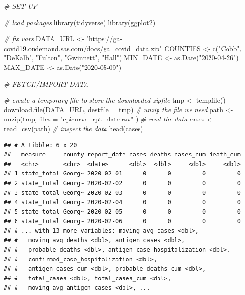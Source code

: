 \documentclass[
  12pt,
]{style/krantz}
\newenvironment{Shaded}{\begin{snugshade}}{\end{snugshade}}
\newcommand{\AttributeTok}[1]{\textcolor[rgb]{0.77,0.63,0.00}{#1}}
\newcommand{\CommentTok}[1]{\textcolor[rgb]{0.56,0.35,0.01}{\textit{#1}}}
\newcommand{\FunctionTok}[1]{\textcolor[rgb]{0.00,0.00,0.00}{#1}}
\newcommand{\NormalTok}[1]{#1}
\newcommand{\OtherTok}[1]{\textcolor[rgb]{0.56,0.35,0.01}{#1}}
\newcommand{\StringTok}[1]{\textcolor[rgb]{0.31,0.60,0.02}{#1}}
\begin{document}
\begin{Shaded}
\begin{Highlighting}[]
\CommentTok{\# SET UP {-}{-}{-}{-}{-}{-}{-}{-}{-}{-}{-}{-}{-}{-}{-}{-}}

\CommentTok{\# load packages}
\FunctionTok{library}\NormalTok{(tidyverse)}
\FunctionTok{library}\NormalTok{(ggplot2)}

\CommentTok{\# fix vars}
\NormalTok{DATA\_URL }\OtherTok{\textless{}{-}} \StringTok{"https://ga{-}covid19.ondemand.sas.com/docs/ga\_covid\_data.zip"}
\NormalTok{COUNTIES }\OtherTok{\textless{}{-}} \FunctionTok{c}\NormalTok{(}\StringTok{"Cobb"}\NormalTok{, }\StringTok{"DeKalb"}\NormalTok{, }\StringTok{"Fulton"}\NormalTok{, }\StringTok{"Gwinnett"}\NormalTok{, }\StringTok{"Hall"}\NormalTok{)}
\NormalTok{MIN\_DATE }\OtherTok{\textless{}{-}} \FunctionTok{as.Date}\NormalTok{(}\StringTok{"2020{-}04{-}26"}\NormalTok{)}
\NormalTok{MAX\_DATE }\OtherTok{\textless{}{-}} \FunctionTok{as.Date}\NormalTok{(}\StringTok{"2020{-}05{-}09"}\NormalTok{)}


\CommentTok{\# FETCH/IMPORT DATA {-}{-}{-}{-}{-}{-}{-}{-}{-}{-}{-}{-}{-}{-}{-}{-}{-}{-}{-}{-}{-}{-}{-}}

\CommentTok{\# create a temporary file to store the downloaded zipfile}
\NormalTok{tmp }\OtherTok{\textless{}{-}} \FunctionTok{tempfile}\NormalTok{()}
\FunctionTok{download.file}\NormalTok{(DATA\_URL, }\AttributeTok{destfile =}\NormalTok{ tmp)}
\CommentTok{\# unzip the file we need}
\NormalTok{path }\OtherTok{\textless{}{-}} \FunctionTok{unzip}\NormalTok{(tmp, }\AttributeTok{files =} \StringTok{"epicurve\_rpt\_date.csv"}\NormalTok{ )}
\CommentTok{\# read the data}
\NormalTok{cases }\OtherTok{\textless{}{-}} \FunctionTok{read\_csv}\NormalTok{(path)}
\CommentTok{\# inspect the data}
\FunctionTok{head}\NormalTok{(cases)}
\end{Highlighting}
\end{Shaded}

\begin{verbatim}
## # A tibble: 6 x 20
##   measure     county report_date cases deaths cases_cum death_cum
##   <chr>       <chr>  <date>      <dbl>  <dbl>     <dbl>     <dbl>
## 1 state_total Georg~ 2020-02-01      0      0         0         0
## 2 state_total Georg~ 2020-02-02      0      0         0         0
## 3 state_total Georg~ 2020-02-03      0      0         0         0
## 4 state_total Georg~ 2020-02-04      0      0         0         0
## 5 state_total Georg~ 2020-02-05      0      0         0         0
## 6 state_total Georg~ 2020-02-06      0      0         0         0
## # ... with 13 more variables: moving_avg_cases <dbl>,
## #   moving_avg_deaths <dbl>, antigen_cases <dbl>,
## #   probable_deaths <dbl>, antigen_case_hospitalization <dbl>,
## #   confirmed_case_hospitalization <dbl>,
## #   antigen_cases_cum <dbl>, probable_deaths_cum <dbl>,
## #   total_cases <dbl>, total_cases_cum <dbl>,
## #   moving_avg_antigen_cases <dbl>, ...
\end{verbatim}
\end{document}
